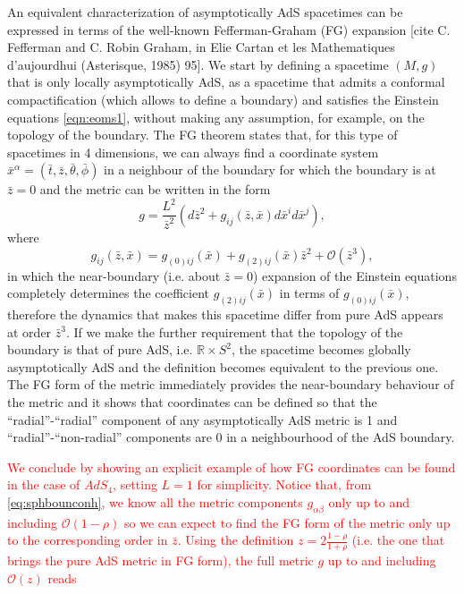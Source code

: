\documentclass[a4paper,11pt]{article}
\begin{document}
An equivalent characterization of asymptotically AdS spacetimes can be expressed in terms of the well-known Fefferman-Graham (FG) expansion [cite C. Fefferman and C. Robin Graham, in Elie Cartan et les Mathematiques d’aujourdhui (Asterisque, 1985) 95]. We start by defining a spacetime $(M,g)$  that is only locally asymptotically AdS, as a spacetime that admits a conformal compactification (which allows to define a boundary) and satisfies the Einstein equations \eqref{eqn:eoms1}, without making any assumption, for example, on the topology of the boundary. The FG theorem states that, for this type of spacetimes in 4 dimensions, we can always find a coordinate system $\bar{x}^\alpha=(\bar{t},\bar{z},\bar{\theta},\bar{\phi})$ in a neighbour of the boundary for which the boundary is at $\bar{z}=0$ and the metric can be written in the form
\begin{equation}
\label{eqn:FGmetric}
g=\frac{L^2}{\bar{z}^2}(d\bar{z}^2+g_{ij}(\bar{z},\bar{x})d\bar{x}^id\bar{x}^j),
\end{equation}
where 
\begin{equation}
\label{eqn:FGbdymetric}
g_{ij}(\bar{z},\bar{x})=g_{(0)ij}(\bar{x})+g_{(2)ij}(\bar{x})\bar{z}^2+\mathcal{O}(\bar{z}^3),
\end{equation}
in which the near-boundary (i.e. about $\bar{z}=0$) expansion of the Einstein equations completely determines the coefficient $g_{(2)ij}(\bar{x})$ in terms of $g_{(0)ij}(\bar{x})$, therefore the dynamics that makes this spacetime differ from pure AdS appears at order $\bar{z}^3$. If we make the further requirement that the topology of the boundary is that of pure AdS, i.e. $\mathbb{R}\times S^2$, the spacetime becomes globally asymptotically AdS and the definition becomes equivalent to the previous one. The FG form of the metric immediately provides the near-boundary behaviour of the metric and it shows that coordinates can be defined so that the ``radial''-``radial'' component of any asymptotically AdS metric is 1 and ``radial''-``non-radial'' components are 0 in a neighbourhood of the AdS boundary.

\textcolor{red}{We conclude by showing an explicit example of how FG coordinates can be found in the case of $AdS_4$, setting $L=1$ for simplicity. Notice that, from  \eqref{eq:sphbounconh}, we know all the metric components $g_{\alpha\beta}$ only up to and including $\mathcal{O}(1-\rho)$ so we can expect to find the FG form of the metric only up to the corresponding order in $\bar{z}$.
Using the definition $z=2\frac{1-\rho}{1+\rho}$ (i.e. the one that brings the pure AdS metric in FG form), the full metric $g$ up to and including $\mathcal{O}(z)$ reads}
\end{document}
